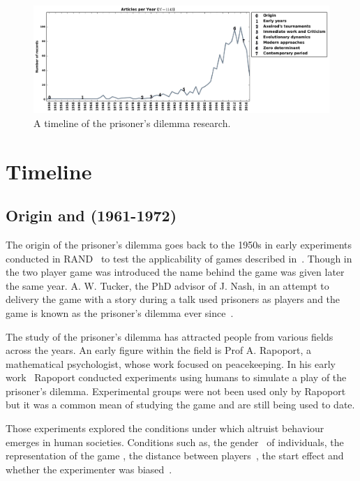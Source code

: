 \documentclass{article}
\begin{document}
\begin{figure}[!htbp]
    \centering
    \includegraphics[width=\textwidth]{assets/images/timeline.pdf}
    \caption{\label{fig:timeline} A timeline of the prisoner's dilemma research.}
\end{figure}

\section{Timeline}\label{section:timeline}

\subsection{Origin and (1961-1972)}

The origin of the prisoner's dilemma goes back to the 1950s in early experiments
conducted in RAND~\cite{Flood1958} to test the applicability of games
described in~\cite{VonNeumann1944}. Though in~\cite{Flood1958} the two player game was
introduced the name behind the game was given later the same year.
A. W. Tucker, the PhD advisor of J. Nash, in an attempt to delivery the game
with a story during a talk used prisoners as players and the game is known as
the prisoner's dilemma ever since~\cite{Tucker1983}.

The study of the prisoner's dilemma has attracted people from various fields
across the years. An early figure within the field is Prof A. Rapoport,
a mathematical psychologist, whose work focused on peacekeeping.
In his early work~\cite{rapoport1965} Rapoport conducted experiments using humans
to simulate a play of the prisoner's dilemma. Experimental groups were not been
used only by Rapoport but it was a common mean of studying the game
\cite{Evans1966, Gallo1968, Lutzker1961, Mack1971, Sensenig1972} and are still
being used to date. %

Those experiments explored the conditions under which altruist behaviour emerges
in human societies. Conditions such as, the gender~\cite{Evans1966,
Lutzker1961, Mack1971} of individuals, the representation of the game
\cite{Evans1966}, the distance between players~\cite{Sensenig1972}, the start effect
\cite{Tedeschi1968} and whether the experimenter was biased~\cite{Gallo1968}.
\end{document}
